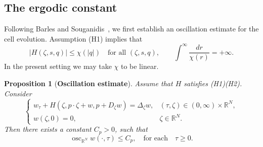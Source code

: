 \documentclass[preprint]{elsarticle}
\newtheorem{proposition}{Proposition}[section]
\numberwithin{equation}{section}
\begin{document}
\subsection{The ergodic constant}
Following Barles and Souganidis~\cite{barles2001space}, we first establish an oscillation estimate for the cell evolution.
Assumption (H1) implies that 
\begin{equation*}
|H(\zeta,s,q)|\le \chi(|q|)
\quad\text{for all }(\zeta,s,q),
\qquad
\int^\infty \frac{dr}{\chi(r)}=+\infty.
\end{equation*}
In the present setting we may take $\chi$ to be linear.

\begin{proposition}[\textbf{Oscillation estimate}]
Assume that $H$ satisfies (H1)(H2). Consider
\begin{equation*}
\begin{cases}
w_\tau+H(\zeta,p\cdot\zeta+w,p+D_\zeta w)=\Delta_\zeta w,
&(\tau,\zeta)\in(0,\infty)\times\mathbb R^N,\\
w(\zeta,0)=0,
&\zeta\in\mathbb R^N.
\end{cases}
\end{equation*}
Then there exists a constant $C_p>0$, such that
\begin{equation*}
\operatorname{osc}_{\mathbb R^N} w(\cdot,\tau)\le C_p, \quad \text{for each}\quad \tau \ge 0.
\end{equation*}\label{oscillation}
\end{proposition}
\end{document}
